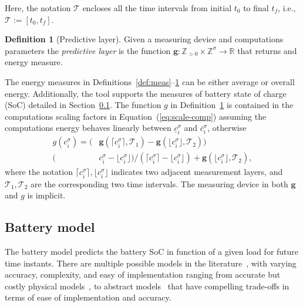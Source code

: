 \documentclass[letterpaper,10pt,journal,twoside]{IEEEtran}
\theoremstyle{definition}
\newtheorem{defn}{Definition}[section]
\begin{document}
Here, the notation $\mathcal{T}$ encloses all the time intervals from initial $t_0$ to final $t_f$, i.e., $\mathcal{T}:=[t_0,t_f]$.

\begin{defn}[Predictive layer]\label{def:pred}
  Given a measuring device and computations parameters the \emph{predictive layer} is the function $\mathbf{g}:\mathbb{Z}_{>0}\times\mathbb{Z}^\sigma\rightarrow\mathbb{R}$ that returns and energy measure.
\end{defn}

The energy measures in Definitions~\ref{def:meas}--\ref{def:pred} can be either average or overall energy. Additionally, the tool supports the measures of battery state of charge (SoC) detailed in Section~\ref{sec:mod-bat}. The function $g$ in Definition~\ref{def:pred} is contained in the computations scaling factors in Equation~(\ref{eq:scale-comp}) assuming the computations energy behaves linearly between $\underline{c}_i^\sigma$ and $\overline{c}_i^\sigma$, otherwise
\begin{equation}\label{eq:piece-wise-reg}\begin{split}
  g(c_i^\sigma)=(&\mathbf{g}(\lceil c_i^\sigma\rceil,\mathcal{T}_1)-\mathbf{g}(\lfloor c_i^\sigma\rfloor,\mathcal{T}_2))\\(&c_i^\sigma-\lfloor c_i^\sigma\rfloor)/(\lceil c_i^\sigma\rceil-\lfloor c_i^\sigma\rfloor)+\mathbf{g}(\lfloor c_i^\sigma\rfloor,\mathcal{T}_2),
\end{split}\end{equation}
where the notation $\lceil c_i^\sigma\rceil,\lfloor c_i^\sigma\rfloor$ indicates two adjacent measurement layers, and $\mathcal{T}_1,\mathcal{T}_2$ are the corresponding two time intervals. The measuring device in both $\mathbf{g}$ and $g$ is implicit.

\subsection{Battery model}
\label{sec:mod-bat}

The battery model predicts the battery SoC in function of a given load for future time instants. There are multiple possible models in the literature~\cite{rao2003battery}, with varying accuracy, complexity, and easy of implementation ranging from accurate but costly physical models~\cite{moura2017battery,marcicki2013design}, to abstract models~\cite{xing2014state,he2011evaluation,hinz2019comparison,mousavi2014various} that have compelling trade-offs in terms of ease of implementation and accuracy. 
\end{document}
